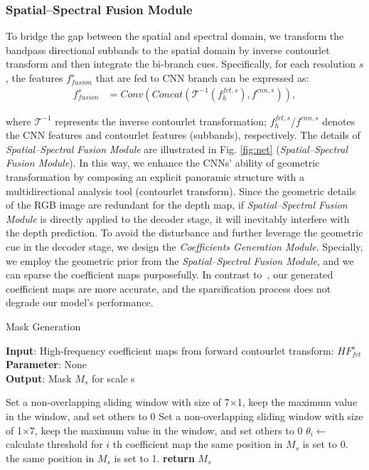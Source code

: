 \documentclass[10pt,times,mathptm,psfig,twocolumn,journals]{IEEEtran}
\begin{document}
\subsubsection{Spatial–Spectral Fusion Module}
\label{SSFM}
To bridge the gap between the spatial and spectral domain, we transform the bandpass directional subbands to the spatial domain by inverse contourlet transform and then integrate the bi-branch cues. Specifically, for each resolution $s$, the features $f_{fusion}^{s}$ that are fed to CNN branch can be expressed as:
\begin{equation} \label{eqn2}
  \begin{split}
  f_{fusion}^{s} &= Conv(Concat(\mathcal{T}^{-1} (f_{h}^{fct,s}), f^{cnn,s})),  
  \end{split}
\end{equation}

where $\mathcal{T}^{-1}$ represents the inverse contourlet transformation; $f_{h}^{fct,s}$/$f^{cnn,s}$ denotes the CNN features and contourlet features (subbands), respectively. The details of \textit{Spatial–Spectral Fusion Module} are illustrated in Fig. \ref{fig:net} (\textit{Spatial–Spectral Fusion Module}). In this way, we enhance the CNNs' ability of geometric transformation by composing an explicit panoramic structure with a multidirectional analysis tool (contourlet transform). Since the geometric details of the RGB image are redundant for the depth map, if \textit{Spatial–Spectral Fusion Module} is directly applied to the decoder stage, it will inevitably interfere with the depth prediction. To avoid the disturbance and further leverage the geometric cue in the decoder stage, we design the \textit{Coefficients Generation Module}. Specially, we employ the geometric prior from the \textit{Spatial–Spectral Fusion Module}, and we can sparse the coefficient maps purposefully. In contrast to~\cite{ramamonjisoa2021single}, our generated coefficient maps are more accurate, and the sparsification process does not degrade our model’s performance. \begin{algorithm}[tb]
\caption{Mask Generation}
\label{alg:algorithm}
\textbf{Input}: High-frequency coefficient maps from forward contourlet transform: $HF_{fct}^{s}$\\
\textbf{Parameter}: None\\
\textbf{Output}: Mask $M_{s}$ for scale s
\begin{algorithmic}[1] \STATE Set a non-overlapping sliding window with size of 7$\times$1,
\STATE    keep the maximum value in the window, and set others to 0
\ENDFOR
\STATE Set a non-overlapping sliding window with size of 1$\times$7,
\STATE    keep the maximum value in the window, and set others to 0
\ENDFOR
\STATE $\theta_{i} \longleftarrow$ calculate threshold for $i$ th coefficient map
\STATE the same position in $M_{s}$ is set to 0.
\ELSE
\STATE the same position in $M_{s}$ is set to 1.
\ENDIF
\ENDFOR
\STATE \textbf{return} $M_{s}$
\end{algorithmic}
\end{algorithm}
\end{document}
